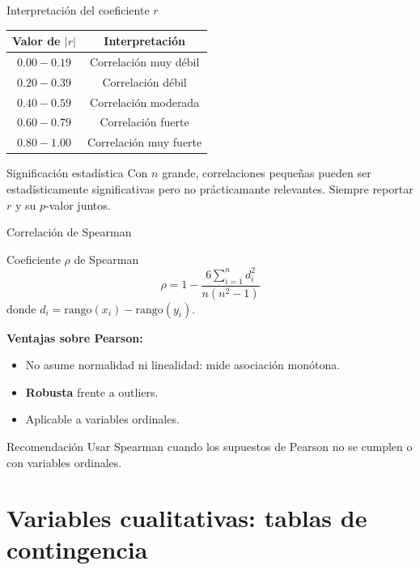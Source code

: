 \documentclass[aspectratio=169]{beamer}
\begin{document}
\begin{frame}{Interpretación del coeficiente $r$}
  \begin{center}
    \begin{tabular}{cc}
      \toprule
      \textbf{Valor de $|r|$} & \textbf{Interpretación} \\
      \midrule
      $0.00 - 0.19$ & Correlación muy débil \\
      $0.20 - 0.39$ & Correlación débil \\
      $0.40 - 0.59$ & Correlación moderada \\
      $0.60 - 0.79$ & Correlación fuerte \\
      $0.80 - 1.00$ & Correlación muy fuerte \\
      \bottomrule
    \end{tabular}
  \end{center}
  \bigskip
  \begin{alertblock}{Significación estadística}
    Con $n$ grande, correlaciones pequeñas pueden ser estadísticamente significativas pero no prácticamante relevantes. Siempre reportar $r$ y su $p$-valor juntos.
  \end{alertblock}
\end{frame}

\begin{frame}{Correlación de Spearman}
  \begin{block}{Coeficiente $\rho$ de Spearman}
    \[
      \rho = 1 - \frac{6 \sum_{i=1}^n d_i^2}{n(n^2-1)}
    \]
    donde $d_i = \text{rango}(x_i) - \text{rango}(y_i)$.
  \end{block}
  \bigskip
  \textbf{Ventajas sobre Pearson:}
  \begin{itemize}
    \item No asume normalidad ni linealidad: mide asociación monótona.
    \item \textbf{Robusta} frente a outliers.
    \item Aplicable a variables ordinales.
  \end{itemize}
  \bigskip
  \begin{exampleblock}{Recomendación}
    Usar Spearman cuando los supuestos de Pearson no se cumplen o con variables ordinales.
  \end{exampleblock}
\end{frame}

\section{Variables cualitativas: tablas de contingencia}
\end{document}

